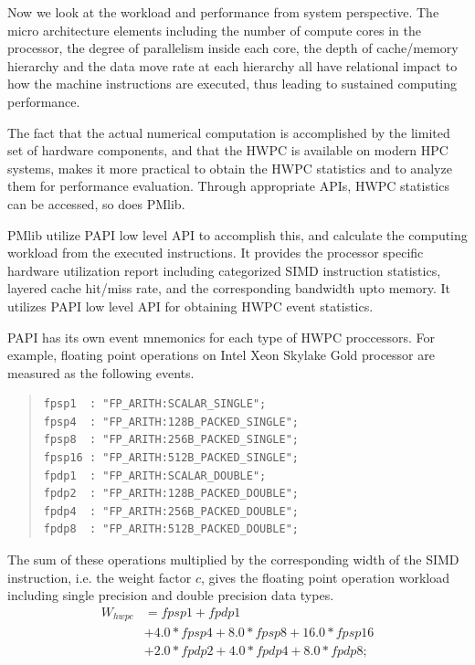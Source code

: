 \documentclass[conference]{IEEEtran}
\begin{document}
Now we look at the workload and performance from system perspective.
The micro architecture elements including the number of compute cores
in the processor, the degree of parallelism inside each core,
the depth of cache/memory hierarchy and the data move rate at each hierarchy
all have relational impact to how the machine instructions are executed,
thus leading to sustained computing performance.

The fact that the actual numerical computation is accomplished by the
limited set of hardware components, and that the HWPC is available
on modern HPC systems, makes it more practical to obtain the HWPC statistics
and to analyze them for performance evaluation.
Through appropriate APIs, HWPC statistics can be accessed, so does PMlib.

PMlib utilize PAPI \cite{papi-1} low level API to accomplish this,
and calculate the computing workload from the executed instructions.
It provides the processor specific hardware utilization report
including categorized SIMD instruction statistics,
layered cache hit/miss rate, and the corresponding bandwidth upto memory.
It utilizes PAPI low level API for obtaining HWPC event statistics.

PAPI has its own event mnemonics for each type of HWPC proccessors.
For example, floating point operations on
Intel Xeon Skylake Gold processor %
are measured as the following events.

\begin{quote}
\begin{small}
\begin{verbatim}
fpsp1  : "FP_ARITH:SCALAR_SINGLE";
fpsp4  : "FP_ARITH:128B_PACKED_SINGLE";
fpsp8  : "FP_ARITH:256B_PACKED_SINGLE";
fpsp16 : "FP_ARITH:512B_PACKED_SINGLE";
fpdp1  : "FP_ARITH:SCALAR_DOUBLE";
fpdp2  : "FP_ARITH:128B_PACKED_DOUBLE";
fpdp4  : "FP_ARITH:256B_PACKED_DOUBLE";
fpdp8  : "FP_ARITH:512B_PACKED_DOUBLE";
\end{verbatim}
\end{small}
\end{quote}

The sum of these operations multiplied by the corresponding width
of the SIMD instruction, i.e. the weight factor $ c $, gives the
floating point operation workload including single precision
and double precision data types.
\begin{align}
	W_{hwpc} & = fpsp1 + fpdp1 \nonumber \\
			& + 4.0*fpsp4 + 8.0*fpsp8 + 16.0*fpsp16 \nonumber \\
			& + 2.0*fpdp2 + 4.0*fpdp4 + 8.0*fpdp8;
\end{align}
\end{document}
